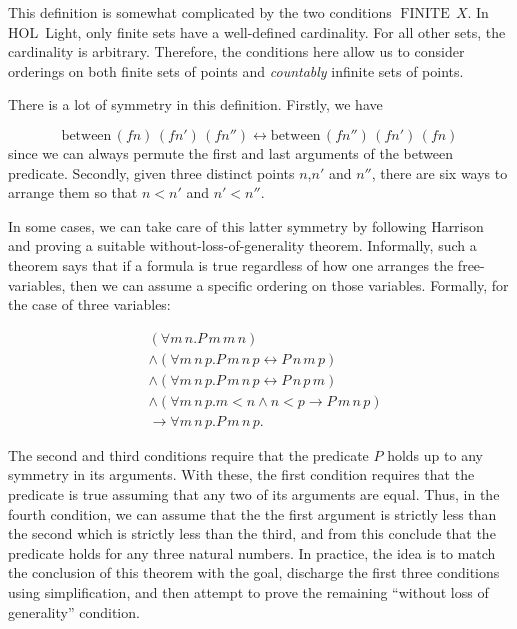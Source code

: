 \documentclass{article}
\DeclareMathOperator{\FINITE}{FINITE}
\newcommand{\between}[3]{\text{between}\,#1\,#2\,#3}
\renewcommand{\implies}{\longrightarrow}
\renewcommand{\iff}{\longleftrightarrow}
\begin{document}
This definition is somewhat complicated by the two conditions $\FINITE\,X$. In HOL~Light, only finite sets have a well-defined cardinality. For all other sets, the cardinality is arbitrary. Therefore, the conditions here allow us to consider orderings on both finite sets of points and \emph{countably} infinite sets of points.

There is a lot of symmetry in this definition. Firstly, we have

\begin{displaymath}
\between{(f n)}{(f n')}{(f n'')} \iff \between{(f n'')}{(f n')}{(f n)}
\end{displaymath}
since we can always permute the first and last arguments of the between predicate. Secondly, given three distinct points $n$,$n'$ and $n''$, there are six ways to arrange them so that $n < n'$ and $n' < n''$.

In some cases, we can take care of this latter symmetry by following Harrison~\cite{HarrisonWLOG} and proving a suitable without-loss-of-generality theorem. Informally, such a theorem says that if a formula is true regardless of how one arranges the free-variables, then we can assume a specific ordering on those variables. Formally, for the case of three variables:

\begin{align*}
&(\forall m\,n. P\,m\,m\,n)\\
&\wedge \left(\forall m\,n\,p. P\,m\,n\,p \iff P\,n\,m\,p\right)\\
&\wedge \left(\forall m\,n\,p. P\,m\,n\,p \iff P\,n\,p\,m\right)\\
&\wedge (\forall m\,n\,p. m < n \wedge n < p \rightarrow P\,m\,n\,p)\\
&\implies \forall m\,n\,p. P\,m\,n\,p.
\end{align*}

The second and third conditions require that the predicate $P$ holds up to any symmetry in its arguments. With these, the first condition requires that the predicate is true assuming that any two of its arguments are equal. Thus, in the fourth condition, we can assume that the the first argument is strictly less than the second which is strictly less than the third, and from this conclude that the predicate holds for any three natural numbers. In practice, the idea is to match the conclusion of this theorem with the goal, discharge the first three conditions using simplification, and then attempt to prove the remaining ``without loss of generality'' condition.
\end{document}

